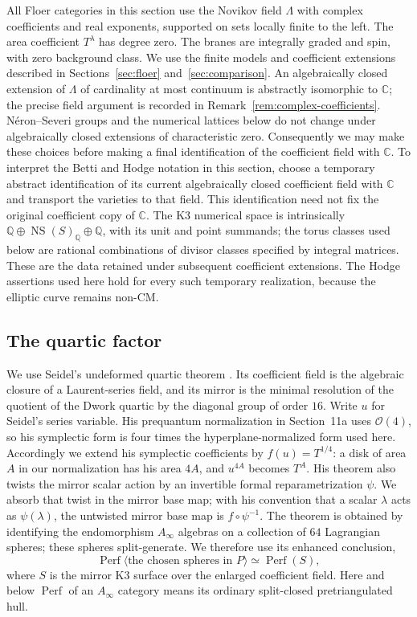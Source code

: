 \documentclass[11pt]{article}
\numberwithin{equation}{section}
\theoremstyle{definition}
\theoremstyle{remark}
\begin{document}
All Floer categories in this section use the Novikov field $\Lambda$ with
complex coefficients and real exponents, supported on sets locally finite to
the left.  The area coefficient $T^\lambda$ has degree zero.  The branes are
integrally graded and spin, with zero background class.  We use the finite
models and coefficient extensions described in Sections~\ref{sec:floer}
and~\ref{sec:comparison}.  An algebraically closed extension of $\Lambda$ of
cardinality at most continuum is abstractly isomorphic to $\mathbb C$; the precise
field argument is recorded in Remark~\ref{rem:complex-coefficients}.  N\'eron--Severi groups
and the numerical lattices below do not change under algebraically closed
extensions of characteristic zero.  Consequently we may make these choices
before making a final identification of the coefficient field with $\mathbb C$.
To interpret the Betti and Hodge notation in this section, choose a
temporary abstract identification of its current algebraically closed
coefficient field with $\mathbb C$ and transport the varieties to that field.
This identification need not fix the original coefficient copy of
$\mathbb C$.  The K3 numerical space is intrinsically
$\mathbb Q\oplus\operatorname{NS}(S)_\mathbb Q\oplus\mathbb Q$, with its unit and point summands;
the torus classes used below are rational combinations of divisor
classes specified by integral matrices.  These are the data retained
under subsequent coefficient extensions.  The Hodge assertions used
here hold for every such temporary realization, because the elliptic
curve remains non-CM.

\subsection{The quartic factor}

We use Seidel's undeformed quartic theorem
\cite[Theorem~1.3]{HMS:SeidelQuartic}.  Its coefficient field is the algebraic
closure of a Laurent-series field, and its mirror is the minimal resolution
of the quotient of the Dwork quartic by the diagonal group of order $16$.
Write $u$ for Seidel's series variable.  His prequantum normalization
in Section~11a uses $\mathcal O(4)$, so his symplectic form is four
times the hyperplane-normalized form used here.  Accordingly we extend
his symplectic coefficients by $f(u)=T^{1/4}$: a disk of area $A$
in our normalization has his area $4A$, and $u^{4A}$ becomes $T^A$.
His theorem also twists the mirror scalar action by an invertible
formal reparametrization $\psi$.  We absorb that twist in the mirror
base map; with his convention that a scalar $\lambda$ acts as
$\psi(\lambda)$, the untwisted mirror base map is $f\circ\psi^{-1}$.
The theorem is obtained by identifying
the endomorphism $A_\infty$ algebras on a collection of $64$ Lagrangian spheres;
these spheres split-generate.  We therefore use its enhanced conclusion,
\begin{equation}\label{eq:quartic-hms}
 \operatorname{Perf}\langle\text{the chosen spheres in }P\rangle
 \simeq\operatorname{Perf}(S),
\end{equation}
where $S$ is the mirror K3 surface over the enlarged coefficient field.
Here and below $\operatorname{Perf}$ of an $A_\infty$ category means its ordinary
split-closed pretriangulated hull.
\end{document}

